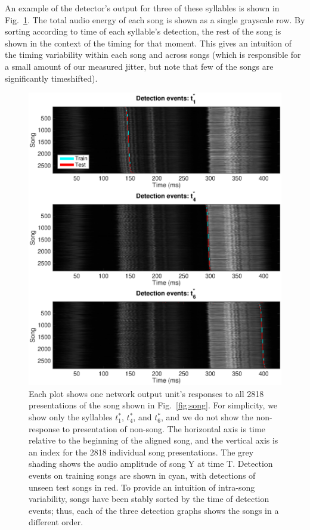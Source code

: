 \documentclass[10pt,letterpaper]{article}
\newcommand\fig[1]{Fig.~\ref{#1}}
\begin{document}
An example of the detector's output for three of these syllables is
shown in \fig{fig:detection_raster}.  The total audio energy of each
song is shown as a single grayscale row.  By sorting according to time
of each syllable's detection, the rest of the song is shown in the
context of the timing for that moment.  This gives an intuition of the
timing variability within each song and across songs (which is
responsible for a small amount of our measured jitter, but note that few of the songs are significantly timeshifted).

\begin{figure}
  \includegraphics[width=\textwidth]{Fig2}
  \caption{Each plot shows one network output unit's responses to all
    2818 presentations of the song shown in \fig{fig:song}.  For
    simplicity, we show only the syllables $t^*_1$, $t^*_4$, and
    $t^*_6$, and we do not show the non-response to presentation of non-song. The horizontal axis is time relative to the beginning of
    the aligned song, and the vertical axis is an index for the 2818
    individual song presentations. The grey shading shows the audio
    amplitude of song Y at time T. Detection events on training songs
    are shown in cyan, with detections of unseen test songs in red.  To provide an intuition of intra-song variability, songs have been
    stably sorted by the time of detection events; thus, each of the
    three detection graphs shows the songs in a different order.}
  \label{fig:detection_raster}
\end{figure}
\end{document}
